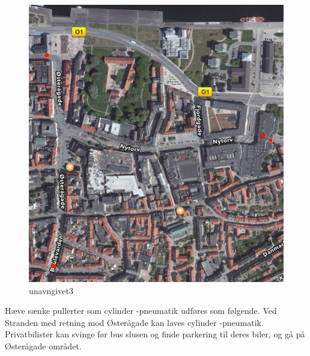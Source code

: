  \begin{figure}[htbp]
  \centering
  \begin{adjustbox}{max width=\textwidth}
    \includegraphics{figures/Billederogfigur/2.jpg}
 \end{adjustbox}
  \caption{unavngivet3}
   \label{fig:unavngivet3}
\end{figure}
                                           
Hæve sænke pullerter som cylinder -pneumatik udføres som følgende. Ved Stranden med retning mod Østerågade kan laves cylinder -pneumatik. Privatbilister kan svinge før bus slusen og finde parkering til deres biler, og gå på Østerågade området. 
                                        
